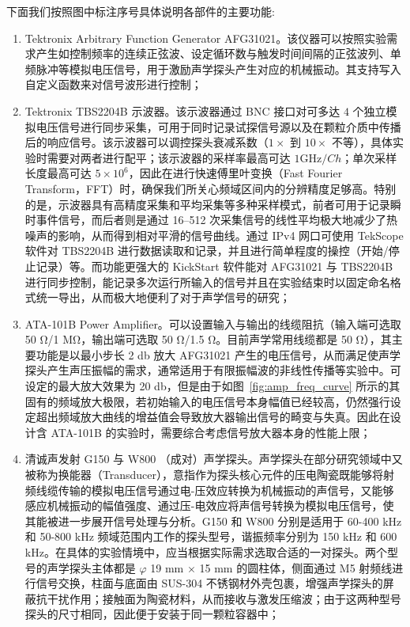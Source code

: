下面我们按照图中标注序号具体说明各部件的主要功能:

\begin{enumerate}
  \item Tektronix Arbitrary Function Generator AFG31021。该仪器可以按照实验需求产生如控制频率的连续正弦波、设定循环数与触发时间间隔的正弦波列、单频脉冲等模拟电压信号，用于激励声学探头产生对应的机械振动。其支持写入自定义函数来对信号波形进行控制；
  \item Tektronix TBS2204B 示波器。该示波器通过 BNC 接口对可多达 $4$ 个独立模拟电压信号进行同步采集，可用于同时记录试探信号源以及在颗粒介质中传播后的响应信号。该示波器可以调控探头衰减系数（$1\times$ 到 $10\times$ 不等），具体实验时需要对两者进行配平；该示波器的采样率最高可达 $1\unit{\giga\hertz}/\unit{Ch}$；单次采样长度最高可达 $5\times 10^{6}$，因此在进行快速傅里叶变换（Fast Fourier Transform，FFT）时，确保我们所关心频域区间内的分辨精度足够高。特别的是，示波器具有高精度采集和平均采集等多种采样模式，前者可用于记录瞬时事件信号，而后者则是通过 \numrange{16}{512} 次采集信号的线性平均极大地减少了热噪声的影响，从而得到相对平滑的信号曲线。通过 IPv4 网口可使用 TekScope 软件对 TBS2204B 进行数据读取和记录，并且进行简单程度的操控（开始/停止记录）等。而功能更强大的 KickStart 软件能对 AFG31021 与 TBS2204B 进行同步控制，能记录多次运行所输入的信号并且在实验结束时以固定命名格式统一导出，从而极大地便利了对于声学信号的研究；
  \item ATA-101B Power Amplifier。可以设置输入与输出的线缆阻抗（输入端可选取 50 \unit{\ohm}/1 \unit{\mega\ohm}，输出端可选取 50 \unit{\ohm}/1.5 \unit{\ohm}。目前声学常用线缆都是 50 \unit{\ohm}），其主要功能是以最小步长 2 \unit{\decibel} 放大 AFG31021 产生的电压信号，从而满足使声学探头产生声压振幅的需求，通常适用于有限振幅波的非线性传播等实验中。可设定的最大放大效果为 20 \unit{\decibel}，但是由于如图~\ref{fig:amp_freq_curve} 所示的其固有的频域放大极限，若初始输入的电压信号本身幅值已经较高，仍然强行设定超出频域放大曲线的增益值会导致放大器输出信号的畸变与失真。因此在设计含 ATA-101B 的实验时，需要综合考虑信号放大器本身的性能上限；
  \item 清诚声发射 G150 与 W800 （成对）声学探头。声学探头在部分研究领域中又被称为换能器（Transducer），意指作为探头核心元件的压电陶瓷既能够将射频线缆传输的模拟电压信号通过电-压效应转换为机械振动的声信号，又能够感应机械振动的幅值强度、通过压-电效应将声信号转换为模拟电压信号，使其能被进一步展开信号处理与分析。G150 和 W800 分别是适用于 60-400 \unit{\kilo\Hz} 和 50-800 \unit{\kilo\hertz} 频域范围内工作的探头型号，谐振频率分别为 150 \unit{\kilo\hertz} 和 600 \unit{\kilo\hertz}。在具体的实验情境中，应当根据实际需求选取合适的一对探头。两个型号的声学探头主体都是 $\varphi$ 19 \unit{\milli\meter} $\times$ 15 \unit{\milli\meter} 的圆柱体，侧面通过 M5 射频线进行信号交换，柱面与底面由 SUS-304 不锈钢材外壳包裹，增强声学探头的屏蔽抗干扰作用；接触面为陶瓷材料，从而接收与激发压缩波；由于这两种型号探头的尺寸相同，因此便于安装于同一颗粒容器中；

\end{enumerate}
